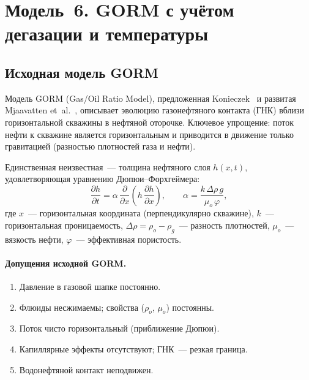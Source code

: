 \documentclass[12pt,a4paper]{article}
\begin{document}
\section{Модель~6. GORM с учётом дегазации и температуры}

\subsection{Исходная модель GORM}

Модель GORM (Gas/Oil Ratio Model), предложенная
Konieczek~\cite{konieczek1990} и развитая
Mjaavatten et~al.~\cite{mjaavatten2006}, описывает эволюцию
газонефтяного контакта (ГНК) вблизи горизонтальной скважины в
нефтяной оторочке. Ключевое упрощение: поток нефти к скважине
является горизонтальным и приводится в движение только
гравитацией (разностью плотностей газа и нефти).

Единственная неизвестная~--- толщина нефтяного слоя $h(x,t)$,
удовлетворяющая уравнению Дюпюи--Форхгеймера:
\begin{equation}\label{eq:gorm_base}
  \boxed{\;
    \frac{\partial h}{\partial t}
    = \alpha\,\frac{\partial}{\partial x}
      \left(h\,\frac{\partial h}{\partial x}\right),
    \qquad
    \alpha = \frac{k\,\Delta\rho\,g}{\mu_o\,\varphi},
  \;}
\end{equation}
где $x$~--- горизонтальная координата (перпендикулярно скважине),
$k$~--- горизонтальная проницаемость,
$\Delta\rho = \rho_o - \rho_g$~--- разность плотностей,
$\mu_o$~--- вязкость нефти, $\varphi$~--- эффективная пористость.

\paragraph{Допущения исходной GORM.}
\begin{enumerate}[nosep]
  \item Давление в газовой шапке постоянно.
  \item Флюиды несжимаемы; свойства ($\rho_o$, $\mu_o$) постоянны.
  \item Поток чисто горизонтальный (приближение Дюпюи).
  \item Капиллярные эффекты отсутствуют; ГНК~--- резкая граница.
  \item Водонефтяной контакт неподвижен.
\end{enumerate}
\end{document}
